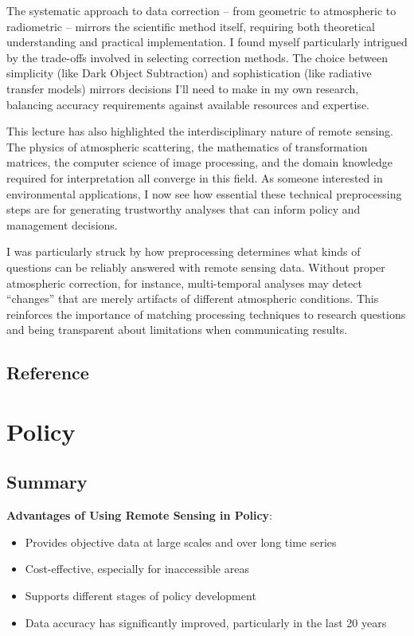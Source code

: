 \documentclass[
  letterpaper,
]{scrbook}
\begin{document}
The systematic approach to data correction -- from geometric to
atmospheric to radiometric -- mirrors the scientific method itself,
requiring both theoretical understanding and practical implementation. I
found myself particularly intrigued by the trade-offs involved in
selecting correction methods. The choice between simplicity (like Dark
Object Subtraction) and sophistication (like radiative transfer models)
mirrors decisions I'll need to make in my own research, balancing
accuracy requirements against available resources and expertise.

This lecture has also highlighted the interdisciplinary nature of remote
sensing. The physics of atmospheric scattering, the mathematics of
transformation matrices, the computer science of image processing, and
the domain knowledge required for interpretation all converge in this
field. As someone interested in environmental applications, I now see
how essential these technical preprocessing steps are for generating
trustworthy analyses that can inform policy and management decisions.

I was particularly struck by how preprocessing determines what kinds of
questions can be reliably answered with remote sensing data. Without
proper atmospheric correction, for instance, multi-temporal analyses may
detect ``changes'' that are merely artifacts of different atmospheric
conditions. This reinforces the importance of matching processing
techniques to research questions and being transparent about limitations
when communicating results.

\section{Reference}\label{reference-1}


\chapter{Policy}\label{policy}

\section{Summary}\label{summary-1}

\textbf{Advantages of Using Remote Sensing in Policy}:

\begin{itemize}
\item
  Provides objective data at large scales and over long time series
\item
  Cost-effective, especially for inaccessible areas
\item
  Supports different stages of policy development
\item
  Data accuracy has significantly improved, particularly in the last 20
  years
\end{itemize}
\end{document}
